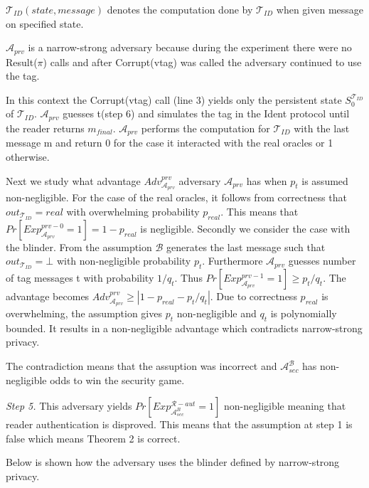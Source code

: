    $\mathcal{T}_{ID}(state, message)$ denotes the computation done by $\mathcal{T}_{ID}$ 
    when given message on specified state. 
    
    $\mathcal{A}_{prv}$ is a narrow-strong adversary because during the experiment there were no Result($\pi$) calls and after Corrupt(vtag) was called 
    the adversary continued to use the tag.

    In this context the Corrupt(vtag) call (line 3) yields only the persistent state $S_0^{\mathcal{T}_{ID}}$ of 
    $\mathcal{T}_{ID}$. $\mathcal{A}_{prv}$ guesses t(step 6) and simulates the tag in the Ident protocol until 
    the reader returns $m_{final}$. $\mathcal{A}_{prv}$ performs the computation for $\mathcal{T}_{ID}$ with the last
    message m and return 0 for the case it interacted with the real oracles or 1 otherwise.

    Next we study what advantage $Adv_{\mathcal{A}_{prv}}^{prv}$ adversary $\mathcal{A}_{prv}$ has when $p_t$ is assumed non-negligible.
    For the case of the real oracles, it follows from correctness that $out_{\mathcal{T}_{ID}} = real$ with overwhelming
    probability $p_{real}$. This means that $Pr[Exp_{\mathcal{A}_{prv}}^{prv-0} = 1] = 1-p_{real}$ is negligible. Secondly we consider the case
    with the blinder. From the assumption $\mathcal{B}$ generates the last message such that $out_{\mathcal{T}_{ID}} = \bot$ with 
    non-negligible probability $p_t$. Furthermore $\mathcal{A}_{prv}$ guesses number of tag messages t with 
    probability $1/q_t$. Thus $Pr[Exp_{\mathcal{A}_{prv}}^{prv-1} = 1] \ge p_t/q_t$. The advantage becomes
    $Adv_{\mathcal{A}_{prv}}^{prv} \ge |1-p_{real}-p_t/q_t|$. Due to correctness $p_{real}$ is overwhelming, the 
    assumption gives $p_t$ non-negligible and $q_t$ is polynomially bounded. It results in a non-negligible 
    advantage which contradicts narrow-strong privacy.

    The contradiction means that the assuption was incorrect and $\mathcal{A}_{sec}^{\mathcal{B}}$ has non-negligible odds to win the security game.

    \textit{Step 5.} This adversary yields $Pr[Exp_{\mathcal{A}_{sec}^{B}}^{\mathcal{R}-aut} = 1]$ non-negligible meaning that reader authentication is disproved. 
    This means that the assumption at step 1 is false which means Theorem 2 is correct. 

    Below is shown how the adversary uses the blinder defined by narrow-strong privacy.

